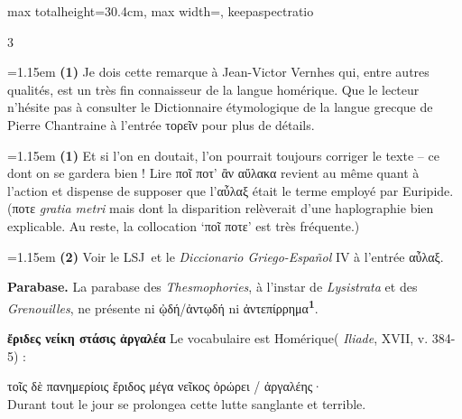 \documentclass[11pt,twoside]{book}
\newcommand{\italique}[1]{\textit{#1}}
\newcommand{\citComm}[1]{\begin{quoting}[vskip=0.4pt,leftmargin=0.7em,rightmargin=0.2em]#1\end{quoting}}
\newcommand{\LSJ}{LSJ}
\newcommand{\francais}[1]{{\policeFr #1}}
\newcommand{\espagnol}[1]{\textit{#1}}
\newcommand{\marqueur}[1]{\textsuperscript{\color{rubricRed}\textbf{#1}}}
\begin{document}
\begin{adjustbox}{max totalheight=30.4cm, max width=\textwidth, keepaspectratio}
\begin{minipage}{\textwidth}
{\begin{multicols}{3}
\par\vspace{1.5pt}
\par\vspace{1.2pt}\par\nopagebreak\vspace{1pt}\noindent\hangindent=1.15em {\color{sepiaNote}\textbf{(1)}} Je dois cette remarque à Jean-Victor Vernhes qui, entre autres qualités, est un très fin connaisseur de la langue homérique. Que le lecteur n'hésite pas à consulter le Dictionnaire étymologique de la langue grecque de Pierre Chantraine à l'entrée τορεῖν pour plus de détails.
\par\vspace{1.5pt}
\noindent\hangindent=1.15em {\color{sepiaNote}\textbf{(1)}} Et si l'on en doutait, l'on pourrait toujours corriger le texte -- ce dont on se gardera bien ! Lire ποῖ ποτ' ἂν αὔλακα revient au même quant à l'action et dispense de supposer que l'αὖλαξ était le terme employé par Euripide. (ποτε \italique{gratia metri} mais dont la disparition relèverait d'une haplographie bien explicable. Au reste, la collocation `ποῖ ποτε' est très fréquente.)
\par\vspace{1.5pt}
\noindent\hangindent=1.15em {\color{sepiaNote}\textbf{(2)}} Voir le \LSJ \ et le \espagnol{Diccionario Griego-Español} IV à l'entrée αὖλαξ.
\par\vspace{1.5pt}
 \textbf{Parabase.} La parabase des \italique{Thesmophories}, à l'instar de \italique{Lysistrata} et des \italique{Grenouilles}, ne présente ni ᾠδή/ἀντῳδή ni ἀντεπίρρημα\marqueur{1}.
\par\vspace{1.5pt}
 \textbf{ἔριδες νείκη στάσις ἀργαλέα} Le vocabulaire est Homérique( \italique{Iliade}, XVII, v. 384-5) :
\citComm{τοῖς δὲ πανημερίοις ἔριδος μέγα νεῖκος ὀρώρει / ἀργαλέης·\\
\francais{Durant tout le jour se prolongea cette lutte sanglante et terrible.}}
\par\vspace{1.5pt}

\end{multicols}}
\end{minipage}
\end{adjustbox}
\end{document}
